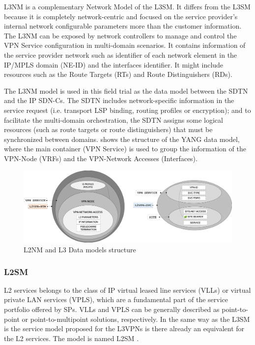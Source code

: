 \documentclass[a4paper,fleqn]{cas-dc}
\begin{document}
L3NM \cite{voyer2019internet} is a complementary Network Model of the L3SM. It differs from the L3SM because it is completely network-centric and focused on the service provider's internal network configurable parameters more than the customer information. The L3NM can be exposed by network controllers to manage and control the VPN Service configuration in multi-domain scenarios. It contains information of the service provider network such as identifier of each network element in the IP/MPLS domain (NE-ID) and the interfaces identifier. It might include resources such as the Route Targets (RTs) and Route Distinguishers (RDs).

The L3NM model is used in this field trial as the data model  between the SDTN and the IP SDN-Cs. The SDTN includes network-specific information in the service request (i.e. transport LSP binding, routing profiles or encryption); and to facilitate the multi-domain orchestration, the SDTN assigns some logical resources (such as route targets or route distinguishers) that must be synchronized between domains.  shows the structure of the YANG data model, where the main container (VPN Service) is used to group the information of the VPN-Node (VRFs) and the VPN-Network Accesses (Interfaces).

\begin{figure}
	\centering
		\includegraphics[scale=0.35]{figs/L3NM_L2NM.png}
	\caption{L2NM and L3 Data models structure}
	\label{FIG:l3nm} 
\end{figure}

\subsubsection{L2SM}
\label{section:l2nm}

L2 services belongs to the class of IP virtual leased line services (VLLs) or virtual private LAN services (VPLS)\cite{andersson2006framework}, which are a fundamental part of the service portfolio offered by SPs. 
VLLs and VPLS can be generally described as point-to-point or point-to-multipoint solutions, respectively. In the same way as the L3SM is the service model proposed for the L3VPNs is there already an equivalent for the L2 services. The model is named L2SM \cite{wen2018yang}. 
\end{document}
